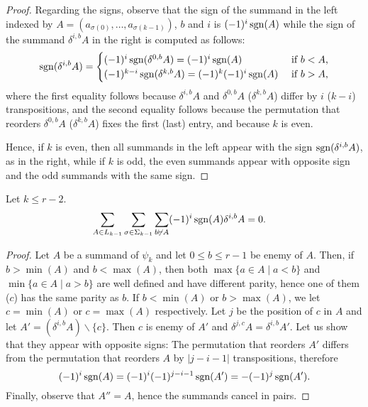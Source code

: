 \begin{proof}

	Regarding the signs, observe that the sign of the summand in the left indexed by $A = (a_{\sigma(0)},\ldots,a_{\sigma(k-1)})$, $b$ and $i$ is $(-1)^i\operatorname*{sgn}(A)$ while the sign of the summand $\delta^{i,b}A$ in the right is computed as follows:
	\[
	\operatorname*{sgn}(\delta^{i,b}A) = \begin{cases}
		(-1)^i\operatorname*{sgn}(\delta^{0,b}A) = (-1)^i\operatorname*{sgn}(A) &\text{ if $b<A$,}\\
		(-1)^{k-i}\operatorname*{sgn}(\delta^{k,b}A) = (-1)^k(-1)^i\operatorname*{sgn}(A) &\text{ if $b>A$,}
	\end{cases}
	\]
	where the first equality follows because $\delta^{i,b}A$ and $\delta^{0,b}A$ (\resp $\delta^{k,b}A$) differ by $i$ (\resp $k-i$) transpositions, and the second equality follows because the permutation that reorders $\delta^{0,b}A$ (\resp $\delta^{k,b}A$) fixes the first (last) entry, and because $k$ is even.

	Hence, if $k$ is even, then all summands in the left appear with the sign $\operatorname*{sgn}(\delta^{i,b}A)$, as in the right, while if $k$ is odd, the even summands appear with opposite sign and the odd summands with the same sign.
\end{proof}
\begin{lemma}\label{lemma:cancel} Let $k\leq r-2$.
	\begin{align*}
		\sum_{A\in L_{k-1}}\sum_{\sigma\in \Sigma_{k-1}}\sum_{b\not{\vdash} A}(-1)^i\operatorname*{sgn}(A)\delta^{i,b}A &= 0.
	\end{align*}
\end{lemma}
\begin{proof}  Let $A$ be a summand of $\psi_k$ and let $0\leq b\leq r-1$ be enemy of $A$. Then, if $b >\min(A)$ and $b<\max(A)$, then both $\max\{a\in A\mid a<b\}$ and $\min\{a\in A\mid a>b\}$ are well defined and have different parity, hence one of them ($c$) has the same parity as $b$. If $b<\min(A)$ or $b>\max(A)$, we let $c = \min(A)$ or $c = \max(A)$ respectively. Let $j$ be the position of $c$ in $A$  and let $A' = (\delta^{i,b} A)\smallsetminus \{c\}$. Then $c$ is enemy of $A'$ and $\delta^{j,c}A = \delta^{i,b}A'$. Let us show that they appear with opposite signs: The permutation that reorders $A'$ differs from the permutation that reorders $A$ by $|j-i-1|$ transpositions, therefore
	\[(-1)^{i}\operatorname*{sgn}(A) = (-1)^{i}(-1)^{j-i-1}\operatorname*{sgn}(A') = -(-1)^j\operatorname*{sgn}(A').\]
	Finally, observe that $A'' = A$, hence the summands cancel in pairs.
\end{proof}






